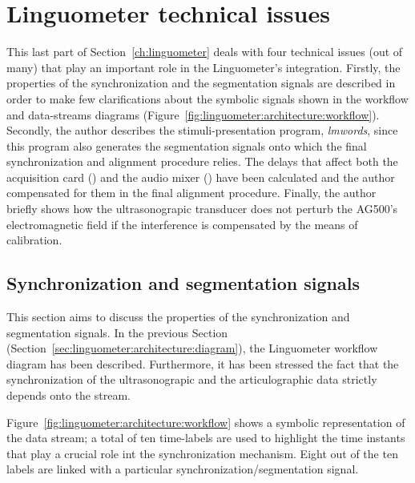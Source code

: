 \section{Linguometer technical issues}
\label{ch:linguometer:technical}
This last part of Section~\ref{ch:linguometer} deals with four technical issues
(out of many) that play an important role in the Linguometer's integration.
Firstly, the properties of the  synchronization and the segmentation signals 
are described in order to make few clarifications about the symbolic signals
shown in the workflow and data-streams diagrams
(Figure~\ref{fig:linguometer:architecture:workflow}).
Secondly, the author describes the stimuli-presentation program, \emph{lmwords},
since this program also generates the segmentation signals onto which the final
synchronization and alignment procedure relies.
The delays that affect both the acquisition card () and the audio mixer
() have been calculated and the author compensated for them in the final
alignment procedure.
Finally, the author briefly shows how the ultrasonograpic transducer does not
perturb the AG500's electromagnetic field if the interference is compensated by
the means of calibration.
\subsection{Synchronization and segmentation signals}
\label{sec:linguometer:technical:signals}
This section aims to discuss the properties of the synchronization and
segmentation signals. 
In the previous Section (Section~\ref{sec:linguometer:architecture:diagram}),
the Linguometer workflow diagram has been described. 
Furthermore, it has been stressed the fact that the synchronization of the 
ultrasonograpic and the articulographic data strictly depends onto the 
 stream.


Figure~\ref{fig:linguometer:architecture:workflow} shows a symbolic
representation of the data  stream; 
a total of ten time-labels are used to highlight the time instants that play a
crucial role int the synchronization mechanism. 
Eight out of the ten labels are linked with a particular
synchronization/segmentation signal.


